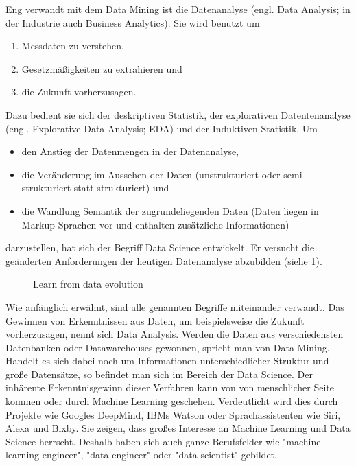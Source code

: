 Eng verwandt mit dem Data Mining ist die Datenanalyse (engl. Data Analysis; in der Industrie auch Business Analytics\citep[S.~58]{swamynathan_mastering_2017}). Sie wird benutzt um\citep[S.~2; Teil 1]{hertle_datenanalyse_2016}
\begin{enumerate}
\item Messdaten zu verstehen,
\item Gesetzmäßigkeiten zu extrahieren und
\item die Zukunft vorherzusagen.
\end{enumerate}
Dazu bedient sie sich der deskriptiven Statistik, der explorativen Datentenanalyse (engl. Explorative Data Analysis; EDA) und der Induktiven Statistik.\citep[S.~17]{hertle_datenanalyse_2016}\newline
Um 
\begin{itemize}
\item den Anstieg der Datenmengen in der Datenanalyse,
\item die Veränderung im Aussehen der Daten (unstrukturiert oder semi-strukturiert statt strukturiert) und
\item die Wandlung Semantik der zugrundeliegenden Daten (Daten liegen in Markup-Sprachen vor und enthalten zusätzliche Informationen)
\end{itemize}
darzustellen, hat sich der Begriff Data Science entwickelt.\citep{dhar_data_2013} Er versucht die geänderten Anforderungen der heutigen Datenanalyse abzubilden (siehe \ref{fig:dataEvolution}).

\begin{figure}[H]
\caption{Learn from data evolution \citep[S.~66]{swamynathan_mastering_2017}}
\label{fig:dataEvolution}
\centering
\end{figure}
Wie anfänglich erwähnt, sind alle genannten Begriffe miteinander verwandt. Das Gewinnen von Erkenntnissen aus Daten, um beispielsweise die Zukunft vorherzusagen, nennt sich Data Analysis. Werden die Daten aus verschiedensten Datenbanken oder Datawarehouses gewonnen, spricht man von Data Mining. Handelt es sich dabei noch um Informationen unterschiedlicher Struktur und große Datensätze, so befindet man sich im Bereich der Data Science. Der inhärente Erkenntnisgewinn dieser Verfahren kann von von menschlicher Seite kommen oder durch Machine Learning geschehen.\newline
Verdeutlicht wird dies durch Projekte wie Googles DeepMind\citep{deepmind_technologies_limited_deepmind_2017}, IBMs Watson\citep{international_business_machines_corporation_ibm_ibm_2017} oder Sprachassistenten wie Siri, Alexa und Bixby. Sie zeigen, dass großes Interesse an Machine Learning und Data Science herrscht. Deshalb haben sich auch ganze Berufsfelder wie "machine learning engineer", "data engineer" oder "data scientist"\citep[S.~1]{ramasubramanian_machine_2017} gebildet.


